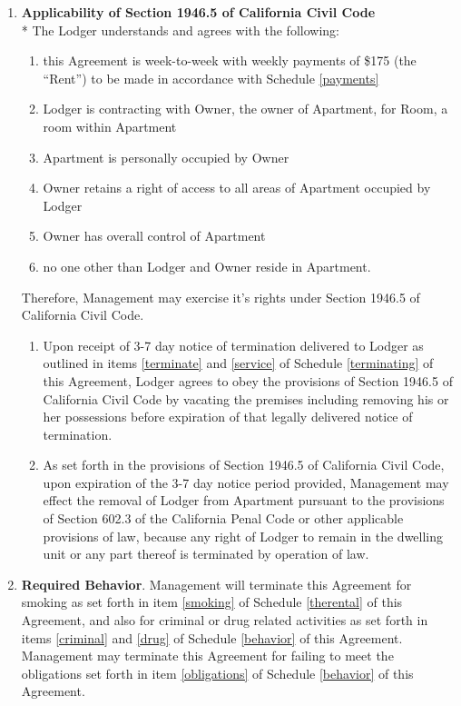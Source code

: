 \documentclass[12pt,letterpaper]{article}
\newcommand{\behavior}{Required Behavior}
\newcommand{\management}{Management}
\newcommand{\apt}{Apartment}
\newcommand{\room}{Room}
\newcommand{\rent}{\$175}
\begin{document}
	\begin{enumerate}
		\item \textbf{Applicability of Section 1946.5 of California Civil Code}\\*
			The Lodger understands and agrees with the following:
			\begin{enumerate}
				\item this Agreement is week-to-week with weekly payments of \rent{} (the ``Rent'') to be made in accordance with Schedule \ref{payments}
				\item Lodger is contracting with Owner, the owner of \apt{}, for \room{}, a room within \apt{}
				\item \apt{} is personally occupied by Owner
				\item Owner retains a right of access to all areas of \apt{} occupied by Lodger 
				\item Owner has overall control of \apt{} 
				\item no one other than Lodger and Owner reside in \apt{}. 
			\end{enumerate}
			Therefore, \management{} may exercise it's rights under Section 1946.5 of California Civil Code.
			\begin{enumerate}
				\item Upon receipt of 3-7 day notice of termination delivered to Lodger as outlined in items \ref{terminate} and \ref{service} of Schedule \ref{terminating} of this Agreement, Lodger agrees to obey the provisions of Section 1946.5 of California Civil Code by vacating the premises including removing his or her possessions before expiration of that legally delivered notice of termination.
				\item As set forth in the provisions of Section 1946.5 of California Civil Code, upon expiration of the 3-7 day notice period provided, \management{} may effect the removal of Lodger from \apt{} pursuant to the provisions of Section 602.3 of the California Penal Code or other applicable provisions of law, because any right of Lodger to remain in the dwelling unit or any part thereof is terminated by operation of law.
			\end{enumerate} 

		\item \textbf{\behavior{}}.
			\management{} will terminate this Agreement for smoking as set forth in item \ref{smoking} of Schedule \ref{therental} of this Agreement, and also for criminal or drug related activities as set forth in items \ref{criminal} and \ref{drug} of Schedule \ref{behavior} of this Agreement. \management{} may terminate this Agreement for failing to meet the obligations set forth in item \ref{obligations} of Schedule \ref{behavior} of this Agreement.
	

\end{enumerate}
\end{document}
